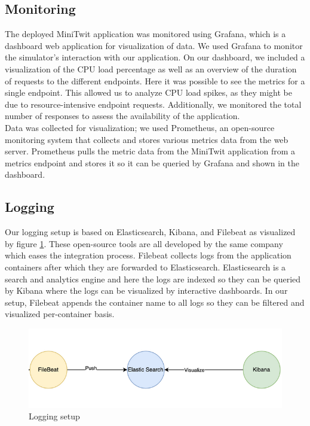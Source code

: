 \subsection{Monitoring}
The deployed MiniTwit application was monitored using Grafana, which is a dashboard web application for visualization of data. 
We used Grafana to monitor the simulator's interaction with our application. On our dashboard, we included a visualization of the CPU load percentage as well as an overview of the duration of requests to the different endpoints. Here it was possible to see the metrics for a single endpoint. This allowed us to analyze CPU load spikes, as they might be due to resource-intensive endpoint requests. Additionally, we monitored the total number of responses to assess the availability of the application. \\

Data was collected for visualization; we used Prometheus, an open-source monitoring system that collects and stores various metrics data from the web server. Prometheus pulls the metric data from the MiniTwit application from a metrics endpoint and stores it so it can be queried by Grafana and shown in the dashboard.

\subsection{Logging}
Our logging setup is based on Elasticsearch, Kibana, and Filebeat as visualized by figure \ref{fig:logging}. These open-source tools are all developed by the same company which eases the integration process. Filebeat collects logs from the application containers after which they are forwarded to Elasticsearch. 
Elasticsearch is a search and analytics engine and here the logs are indexed so they can be queried by Kibana where the logs can be visualized by interactive dashboards.  
In our setup, Filebeat appends the container name to all logs so they can be filtered and visualized per-container basis.

\begin{figure}[H]
    \centering
    \captionsetup{justification=centering,margin=1cm}
    \includegraphics[width=0.8\linewidth]{report/images/logging.png}
    \caption{Logging setup}
    \label{fig:logging}
\end{figure}

